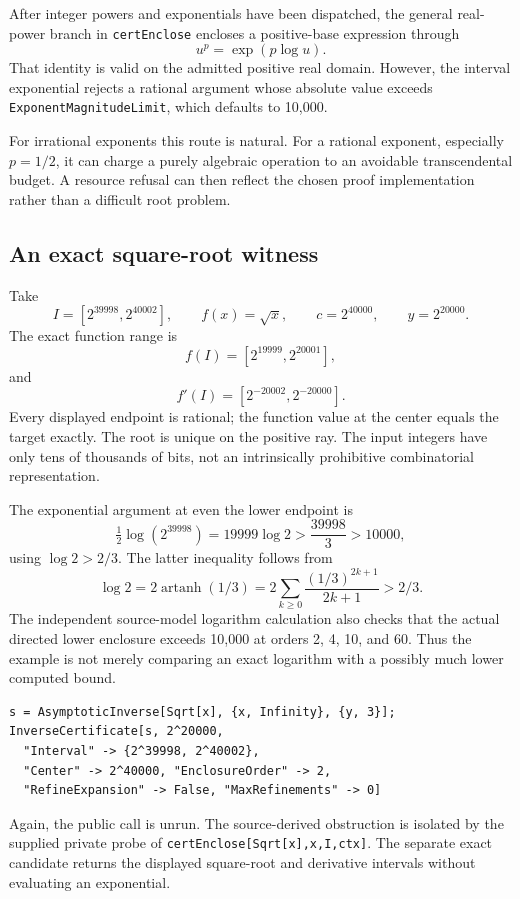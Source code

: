 \documentclass[11pt,a4paper]{article}
\newcommand{\code}[1]{\nolinkurl{#1}}
\begin{document}
After integer powers and exponentials have been dispatched, the general real-power branch in \code{certEnclose} encloses a positive-base expression through
\[
u^p=\exp(p\log u).
\]
That identity is valid on the admitted positive real domain. However, the interval exponential rejects a rational argument whose absolute value exceeds \code{ExponentMagnitudeLimit}, which defaults to 10,000.\cite{cert}

For irrational exponents this route is natural. For a rational exponent, especially $p=1/2$, it can charge a purely algebraic operation to an avoidable transcendental budget. A resource refusal can then reflect the chosen proof implementation rather than a difficult root problem.

\subsection{An exact square-root witness}

Take
\[
I=[2^{39998},2^{40002}],\qquad f(x)=\sqrt{x},\qquad
c=2^{40000},\qquad y=2^{20000}.
\]
The exact function range is
\[
f(I)=[2^{19999},2^{20001}],
\]
and
\[
f'(I)=[2^{-20002},2^{-20000}].
\]
Every displayed endpoint is rational; the function value at the center equals the target exactly. The root is unique on the positive ray. The input integers have only tens of thousands of bits, not an intrinsically prohibitive combinatorial representation.

The exponential argument at even the lower endpoint is
\[
\tfrac12\log(2^{39998})=19999\log2>\frac{39998}{3}>10000,
\]
using $\log2>2/3$. The latter inequality follows from
\[
\log2=2\operatorname{artanh}(1/3)
=2\sum_{k\ge0}\frac{(1/3)^{2k+1}}{2k+1}>2/3.
\]
The independent source-model logarithm calculation also checks that the actual directed lower enclosure exceeds 10,000 at orders 2, 4, 10, and 60. Thus the example is not merely comparing an exact logarithm with a possibly much lower computed bound.

\begin{lstlisting}
s = AsymptoticInverse[Sqrt[x], {x, Infinity}, {y, 3}];
InverseCertificate[s, 2^20000,
  "Interval" -> {2^39998, 2^40002},
  "Center" -> 2^40000, "EnclosureOrder" -> 2,
  "RefineExpansion" -> False, "MaxRefinements" -> 0]
\end{lstlisting}

Again, the public call is unrun. The source-derived obstruction is isolated by the supplied private probe of \code{certEnclose[Sqrt[x],x,I,ctx]}. The separate exact candidate returns the displayed square-root and derivative intervals without evaluating an exponential.
\end{document}
